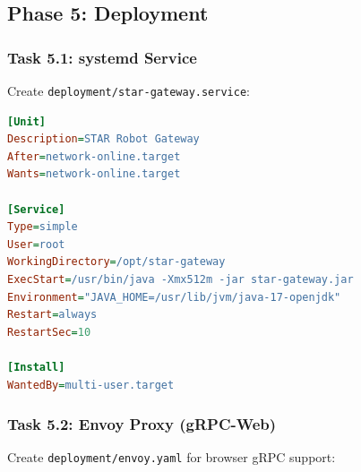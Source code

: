 \documentclass[11pt,letterpaper]{article}
\begin{document}
\subsection{Phase 5: Deployment}

\subsubsection{Task 5.1: systemd Service}

Create \texttt{deployment/star-gateway.service}:

\begin{lstlisting}[language=ini, caption=star-gateway.service]
[Unit]
Description=STAR Robot Gateway
After=network-online.target
Wants=network-online.target

[Service]
Type=simple
User=root
WorkingDirectory=/opt/star-gateway
ExecStart=/usr/bin/java -Xmx512m -jar star-gateway.jar
Environment="JAVA_HOME=/usr/lib/jvm/java-17-openjdk"
Restart=always
RestartSec=10

[Install]
WantedBy=multi-user.target
\end{lstlisting}

\subsubsection{Task 5.2: Envoy Proxy (gRPC-Web)}

Create \texttt{deployment/envoy.yaml} for browser gRPC support:
\end{document}
